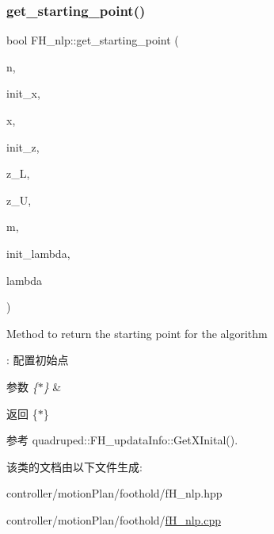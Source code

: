 \subsubsection{\texorpdfstring{get\+\_\+starting\+\_\+point()}{get\_starting\_point()}}
{\footnotesize\ttfamily bool F\+H\+\_\+nlp\+::get\+\_\+starting\+\_\+point (\begin{DoxyParamCaption}\item[{Index}]{n,  }\item[{bool}]{init\+\_\+x,  }\item[{Number $\ast$}]{x,  }\item[{bool}]{init\+\_\+z,  }\item[{Number $\ast$}]{z\+\_\+L,  }\item[{Number $\ast$}]{z\+\_\+U,  }\item[{Index}]{m,  }\item[{bool}]{init\+\_\+lambda,  }\item[{Number $\ast$}]{lambda }\end{DoxyParamCaption})\hspace{0.3cm}{\ttfamily [virtual]}}

Method to return the starting point for the algorithm

\+: 配置初始点 
\begin{DoxyParams}{参数}
{\em \{$\ast$\}} & \\
\hline
\end{DoxyParams}
\begin{DoxyReturn}{返回}
\{$\ast$\} 
\end{DoxyReturn}


参考 quadruped\+::\+F\+H\+\_\+updata\+Info\+::\+Get\+X\+Inital().



该类的文档由以下文件生成\+:\begin{DoxyCompactItemize}
\item 
controller/motion\+Plan/foothold/f\+H\+\_\+nlp.\+hpp\item 
controller/motion\+Plan/foothold/\hyperlink{fH__nlp_8cpp}{f\+H\+\_\+nlp.\+cpp}\end{DoxyCompactItemize}
